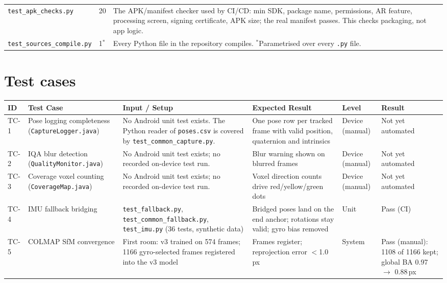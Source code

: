 \begin{longtable}{p{}p{}p{}}
\texttt{test\_apk\_checks.py} & 20 & The APK/manifest checker used by CI/CD: min SDK, package name, permissions, AR feature, processing screen, signing certificate, APK size; the real manifest passes. This checks packaging, not app logic. \\
\texttt{test\_sources\_compile.py} & 1$^{*}$ & Every Python file in the repository compiles. $^{*}$Parametrised over every \texttt{.py} file. \\
\bottomrule
\end{longtable}

\section{Test cases}

{\small\setlength{\tabcolsep}{3pt}
\begin{longtable}{p{}p{}p{}p{}p{}p{}}
\toprule
\textbf{ID} & \textbf{Test Case} & \textbf{Input / Setup} & \textbf{Expected Result} & \textbf{Level} & \textbf{Result} \\
\midrule
\endhead
TC-1 & Pose logging completeness (\texttt{CaptureLogger.java}) & No Android unit test exists. The Python reader of \texttt{poses.csv} is covered by \texttt{test\_common\_capture.py}. & One pose row per tracked frame with valid position, quaternion and intrinsics & Device (manual) & Not yet automated \\
\midrule
TC-2 & IQA blur detection (\texttt{QualityMonitor.java}) & No Android unit test exists; no recorded on-device test run. & Blur warning shown on blurred frames & Device (manual) & Not yet automated \\
\midrule
TC-3 & Coverage voxel counting (\texttt{CoverageMap.java}) & No Android unit test exists; no recorded on-device test run. & Voxel direction counts drive red/yellow/green dots & Device (manual) & Not yet automated \\
\midrule
TC-4 & IMU fallback bridging & \texttt{test\_fallback.py}, \texttt{test\_common\_fallback.py}, \texttt{test\_imu.py} (36 tests, synthetic data) & Bridged poses land on the end anchor; rotations stay valid; gyro bias removed & Unit & Pass (CI) \\
\midrule
TC-5 & COLMAP SfM convergence & First room: v3 trained on 574 frames; 1166 gyro-selected frames registered into the v3 model & Frames register; reprojection error $<$1.0\,px & System & Pass (manual): 1108 of 1166 kept; global BA 0.97 $\rightarrow$ 0.88\,px \\

\end{longtable}}

